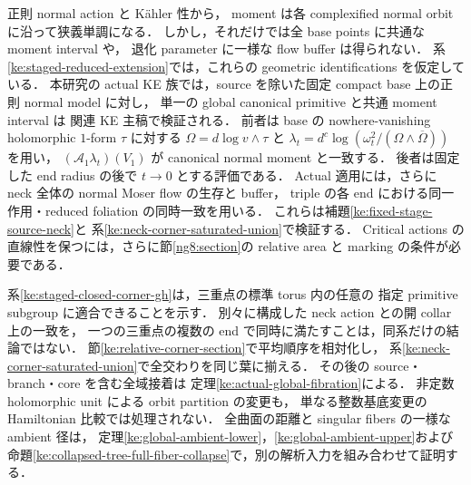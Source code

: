 \begin{remark}
\label{ke:staged-neck-scope}
正則 normal action と K\"ahler 性から，
moment は各 complexified normal orbit に沿って狭義単調になる．
しかし，それだけでは全 base points に共通な moment interval や，
退化 parameter に一様な flow buffer は得られない．
系\ref{ke:staged-reduced-extension}では，これらの geometric identifications を仮定している．
本研究の actual KE 族では，source を除いた固定 compact base 上の正則 normal model に対し，
単一の global canonical primitive と共通 moment interval は
関連 KE 主稿\cite[\texttt{pair:cor:global-primitive}，
\texttt{pair:cor:actual-common-moment}]{KELocalCurrent}で検証される．
前者は base の nowhere-vanishing holomorphic $1$-form $\tau$ に対する
$\Omega=d\log v\wedge\tau$ と
$\lambda_t=d^c\log(\omega_t^2/(\Omega\wedge\overline\Omega))$ を用い，
$(\mathcal A_1\lambda_t)(V_1)$ が canonical normal moment と一致する．
後者は固定した end radius の後で $t\to0$ とする評価である．
Actual 適用には，さらに neck 全体の normal Moser flow の生存と buffer，
triple の各 end における同一作用・reduced foliation の同時一致を用いる．
これらは補題\ref{ke:fixed-stage-source-neck}と
系\ref{ke:neck-corner-saturated-union}で検証する．
Critical actions の直線性を保つには，さらに節\ref{ng8:section}の
relative area と marking の条件が必要である．

系\ref{ke:staged-closed-corner-gh}は，三重点の標準 torus 内の任意の
指定 primitive subgroup に適合できることを示す．
別々に構成した neck action との開 collar 上の一致を，
一つの三重点の複数の end で同時に満たすことは，同系だけの結論ではない．
節\ref{ke:relative-corner-section}で平均順序を相対化し，
系\ref{ke:neck-corner-saturated-union}で全交わりを同じ葉に揃える．
その後の source・branch・core を含む全域接着は
定理\ref{ke:actual-global-fibration}による．
非定数 holomorphic unit による orbit partition の変更も，
単なる整数基底変更の Hamiltonian 比較では処理されない．
全曲面の距離と singular fibers の一様な ambient 径は，
定理\ref{ke:global-ambient-lower}，\ref{ke:global-ambient-upper}および
命題\ref{ke:collapsed-tree-full-fiber-collapse}で，別の解析入力を組み合わせて証明する．
\end{remark}
